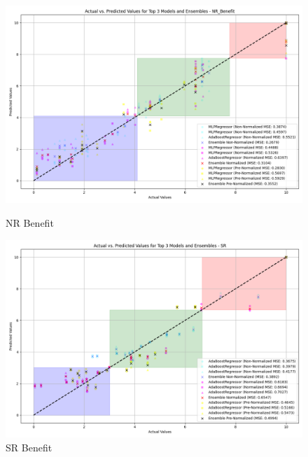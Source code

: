 \begin{figure}[H]
    \centering
    \begin{minipage}{0.45\textwidth}
        \centering
        \includegraphics[width=\linewidth]{reg_section_all/ensemble_learning/actual_vs_predicted_top_3_models_and_ensembles_NR_Benefit.png}
        \caption{NR Benefit}
        \label{reg_all_fig:nr_ben_ensemble}
    \end{minipage}\hfill
    \begin{minipage}{0.45\textwidth}
        \centering
        \includegraphics[width=\linewidth]{reg_section_all/ensemble_learning/actual_vs_predicted_top_3_models_and_ensembles_SR.png}
        \caption{SR Benefit}
        \label{reg_all_fig:sr_ben_ensemble}
    \end{minipage}
\end{figure}

